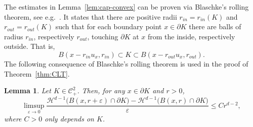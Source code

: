 \documentclass[12pt]{article}
\def\cC{{\mathcal C}}
\def\cH{{\mathcal H}}
\def\e{\varepsilon}
\def\bd{{\partial}}
\newtheorem{lemma}[theorem]{Lemma}
\theoremstyle{definition}
\begin{document}
The estimates in Lemma~\ref{lem:cap-convex} can be proven via Blaschke's rolling theorem, see e.g.~\cite[Cor.~3.2.13]{Sch14}. It states that there are positive radii $r_{in}=r_{in}(K)$ and $ r_{out}=r_{out}(K)$ such that for each boundary point $x \in \bd K$ there are balls of radius $r_{in}$, respectively $r_{out}$, touching $\bd K$ at $x$ from the inside, respectively outside. That is,
\begin{equation} \label{eq:in-out}
B(x-r_{in} u_x, r_{in}) 
\subset K
\subset B(x-r_{out} u_x, r_{out}).
\end{equation}
The following consequence of Blaschke's rolling theorem is used in the proof of Theorem~\ref{thm:CLT}.

\begin{lemma} \label{lem:surface-balls}
Let $K\in \cC_+^2$. Then, for any $x\in \bd K$ and $r>0$, 
\begin{equation*}
\limsup_{\e \to 0} \frac{\cH^{d-1}\big(B(x, r+\e)\cap \bd K\big) - \cH^{d-1}\big(B(x,r)\cap \bd K\big)}{\e}
\leq
C r^{d-2},
\end{equation*}
where $C>0$ only depends on $K$.
\end{lemma}
\end{document}
